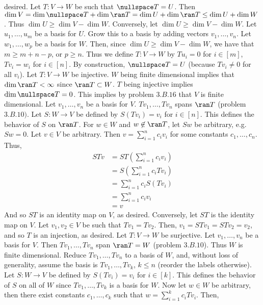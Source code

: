 \documentclass{book}
\begin{document}
\begin{enumerate}[label=\arabic*)]
      desired.
    \ii
      Let $T: V \to W$ be such that $\nullspace T = U$. Then $\dim V = \dim\nullspace T + \dim\ran T = \dim U + \dim\ran T \leq \dim U + \dim W$. Thus $\dim U \geq \dim V - \dim W$. Conversely,
      let $\dim U \geq \dim V - \dim W$. Let $u_1, \dots, u_m$ be a basis for $U$. Grow this to a basis by adding vectors $v_1, \dots, v_n$. Let $w_1, \dots, w_p$ be a basis for $W$. Then,
      since $\dim U \geq \dim V - \dim W$, we have that $m \geq m + n - p$, or $p \geq n$. Thus we define $T: V \to W$ by $Tu_i = 0$ for $i \in [m]$, $Tv_i = w_i$ for $i \in [n]$. By
      construction, $\nullspace T = U$ (because $Tv_i \neq 0$ for all $v_i$).
    \ii
      Let $T: V \to W$ be injective. $W$ being finite dimensional implies that $\dim\ran T < \infty$ since $\ran T \subset W$. $T$ being injective implies $\dim\nullspace T = 0$. This implies
      by problem $3.B.16$ that $V$ is finite dimensional. Let $v_1, \dots, v_n$ be a basis for $V$. $Tv_1, \dots, Tv_n$ spans $\ran T$ (problem $3.B.10)$. Let $S: W \to V$ be defined by
      $S(Tv_i) = v_i$ for $i \in [n]$. This defines the behavior of $S$ on $\ran T$. For $w \in W$ and $w \not\in \ran T$, let $Sw$ be arbitrary, e.g. $Sw = 0$. Let $v \in V$ be arbitrary.
      Then $v = \sum_{i = 1}^{n}c_iv_i$ for some constants $c_1, \dots, c_n$. Thus,
      \begin{align*}
        STv & = ST(\sum_{i = 1}^{n}c_iv_i) \\
        & = S(\sum_{i = 1}^{n}c_iTv_i) \\
        & = \sum_{i = 1}^{n}c_iS(Tv_i) \\
        & = \sum_{i = 1}^{n}c_iv_i \\
        & = v
      \end{align*}
      And so $ST$ is an identity map on $V$, as desired. Conversely, let $ST$ is the identity map on $V$. Let $v_1, v_2 \in V$ be such that $Tv_1 = Tv_2$. Then, $v_1 = STv_1 = STv_2 = v_2$,
      and so $T$ is an injection, as desired.
    \ii
      Let $T: V \to W$ be surjective. Let $v_1, \dots, v_n$ be a basis for $V$. Then $Tv_1, \dots, Tv_n$ span $\ran T = W$ (problem $3.B.10$). Thus $W$ is finite dimensional. Reduce $Tv_1,
      \dots, Tv_n$ to a basis of $W$, and, without loss of generality, assume the basis is $Tv_1, \dots, Tv_k$, $k \leq n$ (reorder the labels otherwise). Let $S: W \to V$ be defined by
      $S(Tv_i) = v_i$ for $i \in [k]$. This defines the behavior of $S$ on all of $W$ since $Tv_1, \dots, Tv_k$ is a basis for $W$. Now let $w \in W$ be arbitrary, then there exist constants
      $c_1, \dots, c_k$ such that $w = \sum_{i = 1}^{k}c_iTv_i$. Then,

\end{enumerate}
\end{document}
